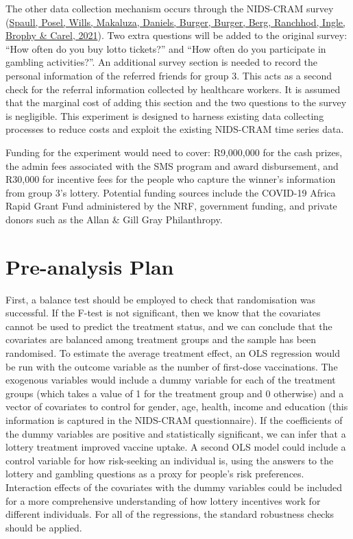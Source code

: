 \documentclass[11pt,preprint, authoryear]{elsarticle}
\numberwithin{equation}{section}
\numberwithin{figure}{section}
\numberwithin{table}{section}
\begin{document}
The other data collection mechanism occurs through the NIDS-CRAM survey
(\protect\hyperlink{ref-quest}{Spaull, Posel, Wills, Makaluza, Daniels,
Burger, Burger, Berg, Ranchhod, Ingle, Brophy \& Carel, 2021}). Two
extra questions will be added to the original survey: ``How often do you
buy lotto tickets?'' and ``How often do you participate in gambling
activities?''. An additional survey section is needed to record the
personal information of the referred friends for group 3. This acts as a
second check for the referral information collected by healthcare
workers. It is assumed that the marginal cost of adding this section and
the two questions to the survey is negligible. This experiment is
designed to harness existing data collecting processes to reduce costs
and exploit the existing NIDS-CRAM time series data.

Funding for the experiment would need to cover: R9,000,000 for the cash
prizes, the admin fees associated with the SMS program and award
disbursement, and R30,000 for incentive fees for the people who capture
the winner's information from group 3's lottery. Potential funding
sources include the COVID-19 Africa Rapid Grant Fund administered by the
NRF, government funding, and private donors such as the Allan \& Gill
Gray Philanthropy.

\hypertarget{pre-analysis-plan}{%
\section{\texorpdfstring{Pre-analysis Plan
\label{pre}}{Pre-analysis Plan }}\label{pre-analysis-plan}}

First, a balance test should be employed to check that randomisation was
successful. If the F-test is not significant, then we know that the
covariates cannot be used to predict the treatment status, and we can
conclude that the covariates are balanced among treatment groups and the
sample has been randomised. To estimate the average treatment effect, an
OLS regression would be run with the outcome variable as the number of
first-dose vaccinations. The exogenous variables would include a dummy
variable for each of the treatment groups (which takes a value of 1 for
the treatment group and 0 otherwise) and a vector of covariates to
control for gender, age, health, income and education (this information
is captured in the NIDS-CRAM questionnaire). If the coefficients of the
dummy variables are positive and statistically significant, we can infer
that a lottery treatment improved vaccine uptake. A second OLS model
could include a control variable for how risk-seeking an individual is,
using the answers to the lottery and gambling questions as a proxy for
people's risk preferences. Interaction effects of the covariates with
the dummy variables could be included for a more comprehensive
understanding of how lottery incentives work for different individuals.
For all of the regressions, the standard robustness checks should be
applied.
\end{document}
